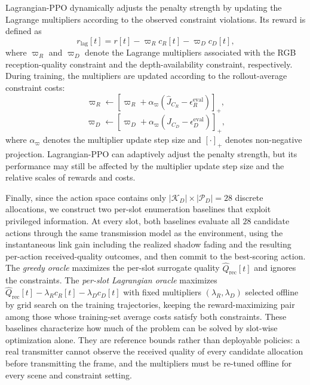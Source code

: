 \documentclass[journal]{IEEEtran}
\begin{document}
Lagrangian-PPO dynamically adjusts the penalty strength by updating the Lagrange multipliers according to the observed constraint violations. 
Its reward is defined as
\begin{equation}
r_{\mathrm{lag}}[t]
=
r[t]
-
\varpi_R c_R[t]
-
\varpi_D c_D[t],
\end{equation}
where $\varpi_R$ and $\varpi_D$ denote the Lagrange multipliers associated with the RGB reception-quality constraint and the depth-availability constraint, respectively. 
During training, the multipliers are updated according to the rollout-average constraint costs:
\begin{equation}
\varpi_R
\leftarrow
\left[
\varpi_R
+
\alpha_{\varpi}
\left(
\hat{J}_{C_R}
-
\epsilon_R^{\mathrm{eval}}
\right)
\right]_+,
\end{equation}
\begin{equation}
\varpi_D
\leftarrow
\left[
\varpi_D
+
\alpha_{\varpi}
\left(
\hat{J}_{C_D}
-
\epsilon_D^{\mathrm{eval}}
\right)
\right]_+,
\end{equation}
where $\alpha_{\varpi}$ denotes the multiplier update step size and $[\cdot]_+$ denotes non-negative projection. 
Lagrangian-PPO can adaptively adjust the penalty strength, but its performance may still be affected by the multiplier update step size and the relative scales of rewards and costs.

Finally, since the action space contains only $|\mathcal{K}_D|\times|\mathcal{P}_D|=28$ discrete allocations, we construct two per-slot enumeration baselines that exploit privileged information. At every slot, both baselines evaluate all $28$ candidate actions through the same transmission model as the environment, using the instantaneous link gain including the realized shadow fading and the resulting per-action received-quality outcomes, and then commit to the best-scoring action. The \emph{greedy oracle} maximizes the per-slot surrogate quality $\hat{Q}_{\mathrm{rec}}[t]$ and ignores the constraints. The \emph{per-slot Lagrangian oracle} maximizes $\hat{Q}_{\mathrm{rec}}[t]-\lambda_R c_R[t]-\lambda_D c_D[t]$ with fixed multipliers $(\lambda_R,\lambda_D)$ selected offline by grid search on the training trajectories, keeping the reward-maximizing pair among those whose training-set average costs satisfy both constraints. These baselines characterize how much of the problem can be solved by slot-wise optimization alone. They are reference bounds rather than deployable policies: a real transmitter cannot observe the received quality of every candidate allocation before transmitting the frame, and the multipliers must be re-tuned offline for every scene and constraint setting.
\end{document}
